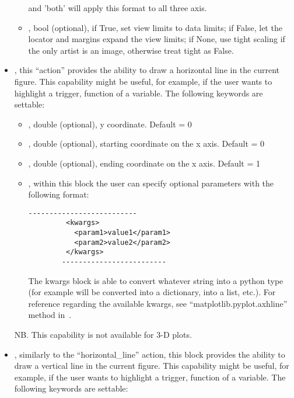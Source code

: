 \begin{itemize}
\begin{itemize}
    and 'both' will apply this format to all three axis.
    \item \textit{}, bool (optional), if True, set view limits to data
    limits; if False, let the locator and margins expand the view limits; if
    None, use tight scaling if the only artist is an image, otherwise treat
    tight as False.
      \end{itemize}
  \item {}, this ``action'' provides the ability to draw a
  horizontal line in the current figure.
  This capability might be useful, for example, if the user wants to highlight a
  trigger, function of a variable.
  The following keywords are settable:
    \begin{itemize}
    \item \textit{}, double (optional), y coordinate.
    Default = 0
    \item \textit{}, double (optional), starting coordinate on the x
    axis.
    Default = 0
    \item \textit{}, double (optional), ending coordinate on the x axis.
    Default = 1
    \item \textit{}, within this block the user can specify optional
    parameters with the following format:
        \begin{lstlisting}[style=XML]
        --------------------------
         <kwargs>
           <param1>value1</param1>
           <param2>value2</param2>
         </kwargs>
        -------------------------
       \end{lstlisting}
    The kwargs block is able to convert whatever string into a python type (for
    example  will be converted into a
    dictionary,  into a list, etc.).
    For reference regarding the available kwargs, see
    ``matplotlib.pyplot.axhline'' method in~\cite{MatPlotLib}.
      \end{itemize}
  NB.
  This capability is not available for 3-D plots.
  \item {}, similarly to the ``horizontal\_line'' action, this
  block provides the ability to draw a vertical line in the current figure.
  This capability might be useful, for example, if the user wants to highlight a
  trigger, function of a variable.
  The following keywords are settable:

\end{itemize}
